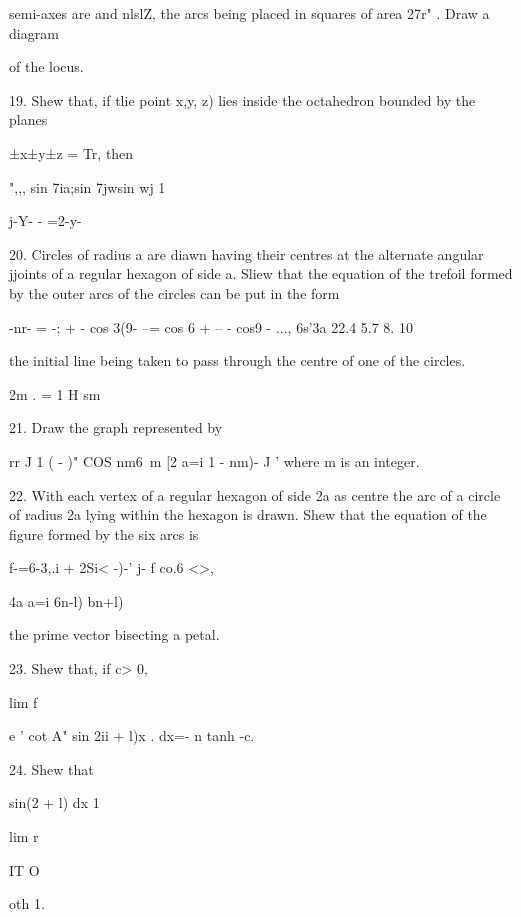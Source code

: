 semi-axes are \pi and nlslZ, the arcs being placed in squares of area
27r" . Draw a diagram

of the locus. 

19. Shew that, if tlie point x,y, z) lies inside the octahedron
bounded by the planes

±x±y±z = Tr, then

",,, sin 7ia;sin 7jwsin wj 1

 j-Y- - =2-y-


20. Circles of radius a are diawn having their centres at the
alternate angular jjoints of a regular hexagon of side a. Sliew that
the equation of the trefoil formed by the outer arcs of the circles
can be put in the form

-nr- = -; + - cos 3(9- --= cos 6 + -- - cos9 - ..., 6s'3a 22.4 5.7 8.
10

the initial line being taken to pass through the centre of one of the
circles.


2m . = 1 H sm

%
%

21. Draw the graph represented by

rr J 1 ( - )" COS nm6\ m [2 a=i 1 - nm)- J ' where m is an integer.

22. With each vertex of a regular hexagon of side 2a as centre the arc
of a circle of radius 2a lying within the hexagon is drawn. Shew that
the equation of the figure formed by the six arcs is

f-=6-3,.i + 2Si< -)-' j- f co.6 <>,

4a a=i 6n-l) bn+l)

the prime vector bisecting a petal. 

23. Shew that, if c> 0,

lim f

e ' cot A" sin 2ii + l)x . dx=- n tanh -c\pi.


24. Shew that

sin(2 + l) dx 1

lim r

IT O

oth 1.


